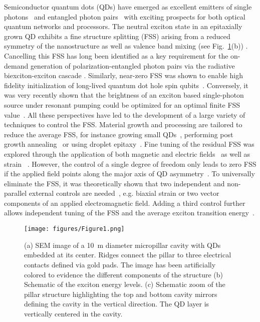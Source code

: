 \documentclass[article,twocolumn, superscriptaddress, 10pt, nofootinbib]{revtex4-1}%
\begin{document}
	
Semiconductor quantum dots (QDs) have emerged as excellent emitters of  single photons~\cite{senellart_high-performance_2017} and entangled photon pairs~\cite{review-entangled-1,review-entangled-2} with exciting prospects for both optical quantum networks and processors. The neutral exciton state in an epitaxially grown QD  exhibits a fine structure splitting (FSS) arising from a reduced symmetry of the nanostructure as well as valence band mixing (see Fig.~\ref{fig1}(b)) \cite{PhysRevB.65.195315,PhysRevB.76.045331}. Cancelling this FSS has long been identified as a key requirement for the on-demand generation of polarization-entangled photon pairs via the radiative biexciton-exciton cascade \cite{Benson2000,liu_solidstate2019}. Similarly, near-zero FSS was shown to enable high fidelity initialization of long-lived quantum dot hole spin qubits~\cite{BrashPRB2015}. Conversely, it was very recently shown that the brightness of an exciton based single-photon source under resonant pumping could be optimized for an optimal  finite FSS value~\cite{Ollivier2020}. All these perspectives have led to the development of a large variety of techniques to control the FSS.  Material growth and processing are tailored to reduce the average  FSS, for instance growing small QDs~\cite{stevenson2006}, performing post growth annealing~\cite{YoungPRB2005} or using droplet epitaxy~\cite{huo2013}. Fine tuning of the residual FSS  was explored through the application of both magnetic and electric fields~\cite{Kowalik2005,gerardot_manipulating_2006,stevenson2006} as well as  strain ~\cite{seidl_2006,kuklewicz2012}.
However, the control of a single degree of freedom  only leads to zero FSS if the applied field points along the major axis of QD asymmetry~\cite{gong2011,Plumhof2011,bennett2012}. To universally eliminate the FSS, it was theoretically shown that two independent and non-parallel external controls are needed~\cite{TrottaUniversalRecovery}, e.g. biaxial strain or two vector components of an applied electromagnetic field. 
Adding a third control further allows independent tuning of the FSS and the average exciton transition energy~\cite{trotta_energy-tunable_2015}.\\


\begin{figure}
    \texttt{[image: figures/Figure1.png]}
    \caption{{(a)  SEM image of a 10~\textmu m diameter micropillar cavity with QDs embedded at its center. Ridges connect the pillar to three  electrical contacts defined via gold pads. The image has been artificially colored to evidence the different components of the structure (b) Schematic  of the exciton energy levels. (c) Schematic zoom of the pillar  structure highlighting the top and bottom cavity mirrors defining the cavity in the vertical direction. The QD layer is vertically centered in the cavity.}  }
    \label{fig1}
\end{figure}
\end{document}
